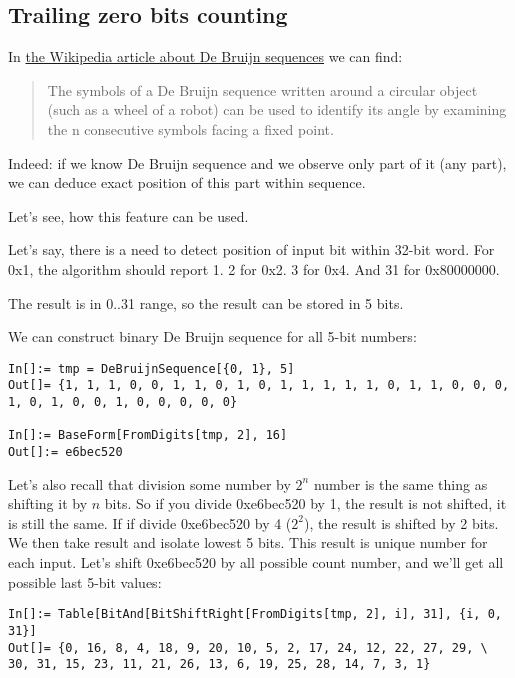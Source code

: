 \subsection{Trailing zero bits counting}

In \href{https://en.wikipedia.org/wiki/De_Bruijn_sequence}{the Wikipedia article about De Bruijn sequences} we can find:

\begin{framed}
\begin{quotation}
The symbols of a De Bruijn sequence written around a circular object (such as a wheel of a robot) can be used to identify its angle by examining the n consecutive symbols facing a fixed point.
\end{quotation}
\end{framed}

Indeed: if we know De Bruijn sequence and we observe only part of it (any part), we can deduce exact position of this part within sequence.

Let's see, how this feature can be used.

Let's say, there is a need to detect position of input bit within 32-bit word.
For 0x1, the algorithm should report 1.
2 for 0x2.
3 for 0x4.
And 31 for 0x80000000.

The result is in 0..31 range, so the result can be stored in 5 bits.

We can construct binary De Bruijn sequence for all 5-bit numbers:

\begin{lstlisting}
In[]:= tmp = DeBruijnSequence[{0, 1}, 5]
Out[]= {1, 1, 1, 0, 0, 1, 1, 0, 1, 0, 1, 1, 1, 1, 1, 0, 1, 1, 0, 0, 0, 1, 0, 1, 0, 0, 1, 0, 0, 0, 0, 0}

In[]:= BaseForm[FromDigits[tmp, 2], 16]
Out[]:= e6bec520
\end{lstlisting}

Let's also recall that division some number by $2^n$ number is the same thing as shifting it by $n$ bits.
So if you divide 0xe6bec520 by 1, the result is not shifted, it is still the same.
If if divide 0xe6bec520 by 4 ($2^2$), the result is shifted by 2 bits.
We then take result and isolate lowest 5 bits.
This result is unique number for each input.
Let's shift 0xe6bec520 by all possible count number, and we'll get all possible last 5-bit values:

\begin{lstlisting}
In[]:= Table[BitAnd[BitShiftRight[FromDigits[tmp, 2], i], 31], {i, 0, 31}]
Out[]= {0, 16, 8, 4, 18, 9, 20, 10, 5, 2, 17, 24, 12, 22, 27, 29, \
30, 31, 15, 23, 11, 21, 26, 13, 6, 19, 25, 28, 14, 7, 3, 1}
\end{lstlisting}


